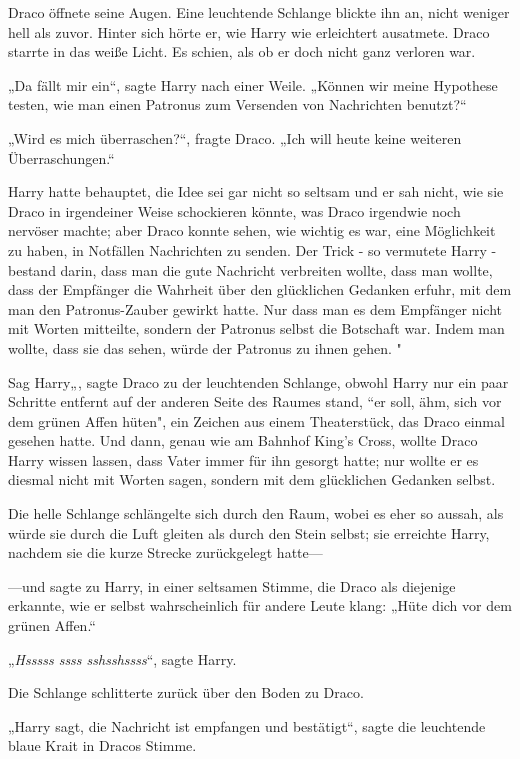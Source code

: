 {Draco öffnete seine Augen. Eine leuchtende Schlange blickte ihn an, nicht weniger hell als zuvor. Hinter sich hörte er, wie Harry wie erleichtert ausatmete. Draco starrte in das weiße Licht. Es schien, als ob er doch nicht ganz verloren war.

„Da fällt mir ein“, sagte Harry nach einer Weile. „Können wir meine Hypothese testen, wie man einen Patronus zum Versenden von Nachrichten benutzt?“

„Wird es mich überraschen?“, fragte Draco. „Ich will heute keine weiteren Überraschungen.“

Harry hatte behauptet, die Idee sei gar nicht so seltsam und er sah nicht, wie sie Draco in irgendeiner Weise schockieren könnte, was Draco irgendwie noch nervöser machte; aber Draco konnte sehen, wie wichtig es war, eine Möglichkeit zu haben, in Notfällen Nachrichten zu senden. Der Trick - so vermutete Harry - bestand darin, dass man die gute Nachricht verbreiten wollte, dass man wollte, dass der Empfänger die Wahrheit über den glücklichen Gedanken erfuhr, mit dem man den Patronus-Zauber gewirkt hatte. Nur dass man es dem Empfänger nicht mit Worten mitteilte, sondern der Patronus selbst die Botschaft war. Indem man wollte, dass sie das sehen, würde der Patronus zu ihnen gehen. "

Sag Harry„, sagte Draco zu der leuchtenden Schlange, obwohl Harry nur ein paar Schritte entfernt auf der anderen Seite des Raumes stand, “er soll, ähm, sich vor dem grünen Affen hüten", ein Zeichen aus einem Theaterstück, das Draco einmal gesehen hatte. Und dann, genau wie am Bahnhof King's Cross, wollte Draco Harry wissen lassen, dass Vater immer für ihn gesorgt hatte; nur wollte er es diesmal nicht mit Worten sagen, sondern mit dem glücklichen Gedanken selbst.

Die helle Schlange schlängelte sich durch den Raum, wobei es eher so aussah, als würde sie durch die Luft gleiten als durch den Stein selbst; sie erreichte Harry, nachdem sie die kurze Strecke zurückgelegt hatte—

—und sagte zu Harry, in einer seltsamen Stimme, die Draco als diejenige erkannte, wie er selbst wahrscheinlich für andere Leute klang: „Hüte dich vor dem grünen Affen.“

„\emph{Hsssss ssss sshsshssss}“, sagte Harry.

Die Schlange schlitterte zurück über den Boden zu Draco.

„Harry sagt, die Nachricht ist empfangen und bestätigt“, sagte die leuchtende blaue Krait in Dracos Stimme.

}
